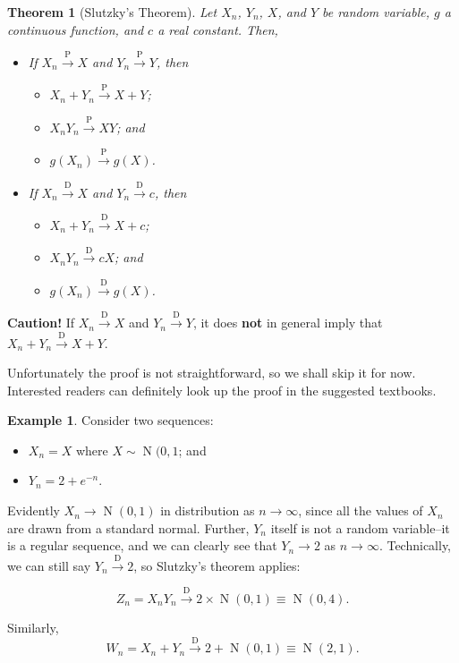 \documentclass[
]{book}
\providecommand{\tightlist}{%
  \setlength{\itemsep}{0pt}\setlength{\parskip}{0pt}}
\DeclareMathOperator{\N}{N}
\newtheorem{theorem}{Theorem}[chapter]
\theoremstyle{definition}
\theoremstyle{definition}
\newtheorem{example}{Example}[chapter]
\theoremstyle{definition}
\theoremstyle{definition}
\theoremstyle{remark}
\begin{document}
\begin{theorem}[Slutzky's Theorem]

Let \(X_n\), \(Y_n\), \(X\), and \(Y\) be random variable, \(g\) a continuous function, and
\(c\) a real constant. Then,

\begin{itemize}
\item
  If \(X_n{\xrightarrow{\text{P}}} X\) and \(Y_n{\xrightarrow{\text{P}}} Y\),
  then

  \begin{itemize}
  \tightlist
  \item
    \(X_n+Y_n{\xrightarrow{\text{P}}} X+Y\);
  \item
    \(X_nY_n{\xrightarrow{\text{P}}} XY\); and
  \item
    \(g(X_n){\xrightarrow{\text{P}}} g(X)\).
  \end{itemize}
\item
  If \(X_n{\xrightarrow{\text{D}}} X\) and \(Y_n{\xrightarrow{\text{D}}} c\), then

  \begin{itemize}
  \tightlist
  \item
    \(X_n+Y_n{\xrightarrow{\text{D}}} X+c\);
  \item
    \(X_nY_n{\xrightarrow{\text{D}}} cX\); and
  \item
    \(g(X_n){\xrightarrow{\text{D}}} g(X)\).
  \end{itemize}
\end{itemize}

\end{theorem}

\textbf{Caution!} If \(X_n{\xrightarrow{\text{D}}} X\) and
\(Y_n{\xrightarrow{\text{D}}} Y\), it does \textbf{not} in general imply that
\(X_n+Y_n{\xrightarrow{\text{D}}} X+Y\).

Unfortunately the proof is not straightforward, so we shall skip it for now.
Interested readers can definitely look up the proof in the suggested textbooks.

\begin{example}
Consider two sequences:

\begin{itemize}
\tightlist
\item
  \(X_n = X\) where \(X\sim\N(0,1\); and
\item
  \(Y_n = 2 + e^{-n}\).
\end{itemize}

Evidently \(X_n \to \N(0,1)\) in distribution as \(n\to\infty\), since all the values of \(X_n\) are drawn from a standard normal.
Further, \(Y_n\) itself is not a random variable--it is a regular sequence, and we can clearly see that \(Y_n \to 2\) as \(n\to\infty\).
Technically, we can still say \(Y_n{\xrightarrow{\text{D}}} 2\), so Slutzky's theorem applies:

\[
Z_n = X_nY_n \xrightarrow{\text{D}} 2 \times \N(0,1) \equiv \N(0,4).
\]

Similarly,
\[
W_n = X_n + Y_n \xrightarrow{\text{D}} 2 + \N(0,1) \equiv \N(2,1).
\]
\end{example}
\end{document}
